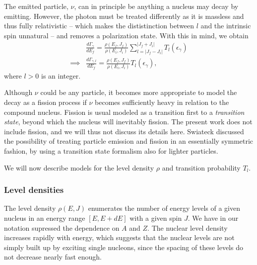
The emitted particle, $\nu$, can in principle be anything a nucleus may decay by emitting. However, the photon must be treated differently as it is massless and thus fully relativistic -- which makes the dististinction between $l$ and the intrinsic spin unnatural -- and removes a polarization state. With this in mind, we obtain
\begin{align}
&\frac{d\Gamma_{\gamma}}{dE_f} = \frac{\rho(E_f,J_f)}{\rho(E_i,J_i)} \sum_{l=|J_f-J_i|}^{|J_f+J_i|} T_l(\epsilon_\gamma) \\
\implies & \frac{d\Gamma_{\gamma,l}}{dE_f} =\frac{\rho(E_f,J_f)}{\rho(E_i,J_i)} T_l(\epsilon_\gamma),\label{eq:gammagamma}
\end{align}
where $l>0$ is an integer.

Although $\nu$ could be any particle, it becomes more appropriate to model the decay as a fission process if $\nu$ becomes sufficiently heavy in relation to the compound nucleus. Fission is usual modeled as a transition first to a \emph{transition state}, beyond which the nucleus will inevitably fission\cite{krane:book}. The present work does not include fission, and we will thus not discuss its details here. Swiateck discussed the possibility of treating particle emission and fission in an essentially symmetric fashion, by using a transition state formalism also for lighter particles\cite{swiatecki:1983:art}. 

We will now describe models for the level density $\rho$ and transition probability $T_l$.

\subsubsection{Level densities}
The level density $\rho(E,J)$ enumerates the number of energy levels of a given nucleus in an energy range $[E,E+dE]$ with a given spin $J$. We have in our notation supressed the dependence on $A$ and $Z$. The nuclear level density increases rapidly with energy, which suggests that the nuclear levels are not simply built up by exciting single nucleons, since the spacing of these levels do not decrease nearly fast enough.

